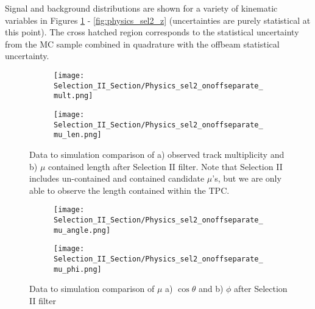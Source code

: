 \documentclass{article}
\begin{document}


Signal and background distributions are shown for a variety of kinematic variables in Figures \ref{fig:physics_sel2_mulen} - \ref{fig:physics_sel2_z} (uncertainties are purely statistical at this point). The cross hatched region corresponds to the statistical uncertainty from the MC sample combined in quadrature with the offbeam statistical uncertainty.

\begin{figure}[h!]
\centering
  \begin{subfigure}[t]{0.3\textwidth}
    \centering
\texttt{[image: Selection\_II\_Section/Physics\_sel2\_onoffseparate\_mult.png]}
    \caption{ }
  \end{subfigure} 
  \hspace{30 mm}
  \begin{subfigure}[t]{0.3\textwidth}
    \centering
\texttt{[image: Selection\_II\_Section/Physics\_sel2\_onoffseparate\_mu\_len.png]}
    \caption{ }
  \end{subfigure} 
 
\caption{ Data to simulation comparison of a) observed track multiplicity and b) $\mu$ contained length after Selection II filter.  Note that Selection II includes un-contained and contained candidate $\mu$'s, but we are only able to observe the length contained within the TPC.  }
\label{fig:physics_sel2_mulen}
\end{figure}

\begin{figure}[h!]
\centering
  \begin{subfigure}[t]{0.3\textwidth}
    \centering
\texttt{[image: Selection\_II\_Section/Physics\_sel2\_onoffseparate\_mu\_angle.png]}
   \caption{ }
  \end{subfigure} 
  \hspace{30 mm}
  \begin{subfigure}[t]{0.3\textwidth}
    \centering
    \texttt{[image: Selection\_II\_Section/Physics\_sel2\_onoffseparate\_mu\_phi.png]}
  \caption{ }
  \end{subfigure} 
\caption{ Data to simulation comparison of $\mu$ a) $\cos\theta$  and b) $\phi$ after Selection II filter }
\label{fig:physics_sel2_muphi}
\end{figure}
\end{document}
